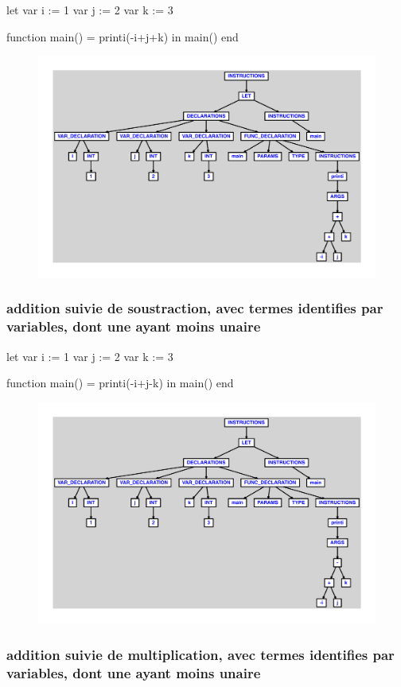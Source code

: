 \documentclass{article}
\begin{document}
\begin{verbatimtab}
let
	var i := 1
	var j := 2
	var k := 3

	function main() = printi(-i+j+k)
in main() end
\end{verbatimtab}
\begin{figure}[H]\centering\includegraphics[max width=\textwidth]{ast/ast_79.pdf}\end{figure}\subsubsection{addition suivie de soustraction, avec termes identifies par variables, dont une ayant moins unaire}
\begin{verbatimtab}
let
	var i := 1
	var j := 2
	var k := 3

	function main() = printi(-i+j-k)
in main() end
\end{verbatimtab}
\begin{figure}[H]\centering\includegraphics[max width=\textwidth]{ast/ast_80.pdf}\end{figure}\subsubsection{addition suivie de multiplication, avec termes identifies par variables, dont une ayant moins unaire}
\end{document}
